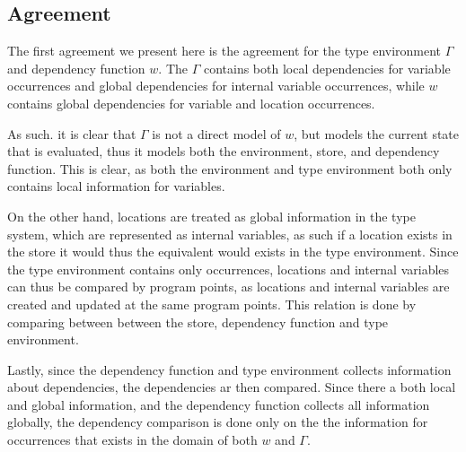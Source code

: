 \documentclass[../../master.tex]{subfiles}
\begin{document}
\subsection{Agreement}
The first agreement we present here is the agreement for the type environment $\Gamma$ and dependency function $w$.
The $\Gamma$ contains both local dependencies for variable occurrences and global dependencies for internal variable occurrences, while $w$ contains global dependencies for variable and location occurrences.

As such. it is clear that $\Gamma$ is not a direct model of $w$, but models the current state that is evaluated, thus it models both the environment, store, and dependency function.
This is clear, as both the environment and type environment both only contains local information for variables.

On the other hand, locations are treated as global information in the type system, which are represented as internal variables, as such if a location exists in the store it would thus the equivalent would exists in the type environment.
Since the type environment contains only occurrences, locations and internal variables can thus be compared by program points, as locations and internal variables are created and updated at the same program points.
This relation is done by comparing between between the store, dependency function and type environment.

Lastly, since the dependency function and type environment collects information about dependencies, the dependencies ar then compared.
Since there a both local and global information, and the dependency function collects all information globally, the dependency comparison is done only on the the information  for occurrences that exists in the domain of both $w$ and $\Gamma$.
\end{document}
